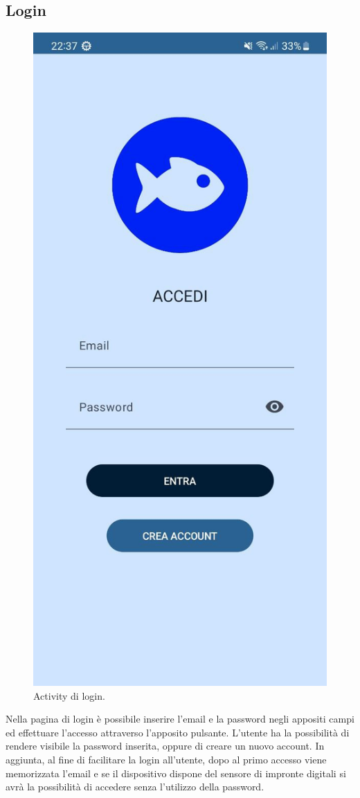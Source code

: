 \documentclass[a4paper,final,12pt]{report}
\begin{document}
\subsection{Login}
\begin{figure}[hbtp]
\centering
\includegraphics[scale=0.20]{img_concettuale/accmob.jpg}
\caption{Activity di login.}
\end{figure}
Nella pagina di login è possibile inserire l'email e la password negli appositi campi ed effettuare l'accesso attraverso l'apposito pulsante. L'utente ha la possibilità di rendere visibile la password inserita, oppure di creare un nuovo account. In aggiunta, al fine di facilitare la login all'utente, dopo al primo accesso viene memorizzata l'email e se il dispositivo dispone del sensore di impronte digitali si avrà la possibilità di accedere senza l'utilizzo della password. 
\end{document}
